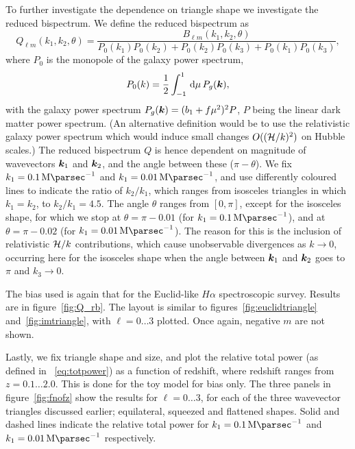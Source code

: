 {To further investigate the dependence on triangle shape we investigate the reduced bispectrum. We define the reduced bispectrum as
\begin{equation}
	Q_{\ell m}(k_1,k_2,\theta) = \frac{B_{\ell m}(k_1,k_2,\theta)}{P_0(k_1) P_0(k_2) + P_0(k_2) P_0(k_3) + P_0(k_1) P_0(k_3)},
\end{equation}
where %
\(P_0\) is the monopole of the galaxy power spectrum,
\begin{equation}
	P_0(k) = \frac{1}{2} \int_{-1}^1 \,\mathrm{d}\mu \, P_g(\bm {k}), 
\end{equation}
with the galaxy power spectrum \(P_g(\bm {k}) = (b_1 + f \mu^2)^2 P\), \(P\) being the linear dark matter power spectrum. (An alternative definition would be to use the relativistic galaxy power spectrum which would induce small changes $O((\mathcal{H}/k)^2)$ on Hubble scales.) The reduced bispectrum \(Q\) is hence dependent on magnitude of wavevectors \(\bm {k}_1\) and \(\bm {k}_2\), and the angle  between these (\(\pi-\theta\)). We fix \(k_1 = \SI{0.1}{\mega\parsec\tothe{-1}}\) and \(k_1 = \SI{0.01}{\mega\parsec\tothe{-1}}\), and use differently coloured lines to indicate the ratio of \(k_2/k_1\), which ranges from isosceles triangles in which \(k_1 = k_2\), to \(k_2/k_1 = 4.5\). The angle \(\theta\) ranges from \([0,\pi]\), except for the isosceles shape, for which we stop at \(\theta = \pi - 0.01\) (for \(k_1 = \SI{0.1}{\mega\parsec\tothe{-1}}\)), and at \(\theta = \pi - 0.02\) (for \(k_1 = \SI{0.01}{\mega\parsec\tothe{-1}}\)). The reason for this is the inclusion of relativistic \(\mathcal{H}/k\) contributions, which cause unobservable divergences as \(k \to 0\), occurring here for the isosceles shape when the angle between \(\bm {k}_1\) and \(\bm {k}_2\) goes to \(\pi\) and \(k_3 \to 0\). 

The bias used is again that for the Euclid-like \(H\alpha\) spectroscopic survey. Results are in figure~\ref{fig:Q_rb}. The layout is similar to figures~\ref{fig:euclidtriangle} and~\ref{fig:imtriangle}, with \(\ell = 0 \ldots 3\) plotted. Once again, negative \(m\) are not shown. 

Lastly, we fix triangle shape and size, and plot the relative total power (as defined in ~\eqref{eq:totpower}) as a function of redshift, where redshift ranges from \( z = 0.1 \ldots 2.0\). This is done for the toy model for bias only. The three panels in figure~\ref{fig:fnofz} show the results for \(\ell = 0 \ldots 3\), for each of the three wavevector triangles discussed earlier; equilateral, squeezed and flattened shapes. Solid and dashed lines indicate the relative total power for \(k_1 = \SI{0.1}{\mega\parsec\tothe{-1}}\) and \(k_1 = \SI{0.01}{\mega\parsec\tothe{-1}}\) respectively. 

}

